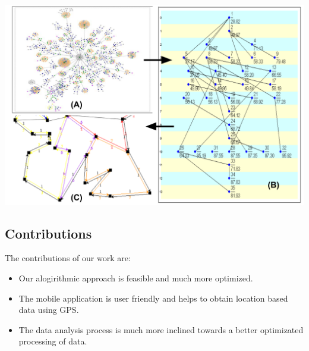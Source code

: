 \documentclass{acm_proc_article-sp}
\begin{document}
\begin{center}\vspace{0.2cm}
\includegraphics[width=1.1\linewidth]{data.png}
\end{center}\vspace{0.2cm}



\subsection{Contributions}

The contributions of our work are:

\begin{itemize}
\item{Our alogirithmic approach is feasible and much more optimized.}
\item{The mobile application is user friendly and helps to obtain location based data using GPS.}
\item{The data analysis process is much more inclined towards a better optimizated processing of data.}
\end{itemize}
\end{document}
